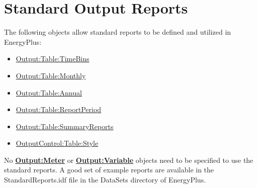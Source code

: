 \chapter{Standard Output Reports}\label{standard-output-reports}

The following objects allow standard reports to be defined and utilized in EnergyPlus:

\begin{itemize}
\item
  \hyperref[outputtabletimebins]{Output:Table:TimeBins}
\item
  \hyperref[outputtablemonthly]{Output:Table:Monthly}
\item
  \hyperref[outputtableannual]{Output:Table:Annual}
\item 
  \hyperref[outputtablereportperiod]{Output:Table:ReportPeriod}
\item
  \hyperref[outputtablesummaryreports]{Output:Table:SummaryReports}
\item
  \hyperref[outputcontroltablestyle]{OutputControl:Table:Style}
\end{itemize}

No \textbf{\hyperref[outputmeter-and-outputmetermeterfileonly]{Output:Meter}} or
\textbf{\hyperref[outputvariable]{Output:Variable}} objects need to be specified
to use the standard reports. A good set of example reports are available in the
StandardReports.idf file in the DataSets directory of EnergyPlus.











